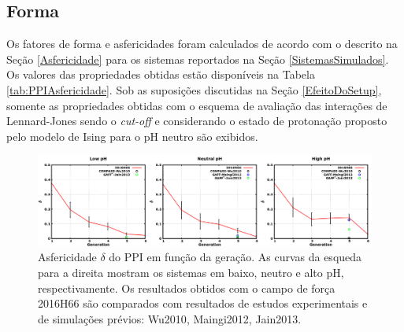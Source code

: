 \subsection{Forma}\label{PPIForma}

Os fatores de forma e asfericidades foram calculados de acordo com o descrito na Seção \ref{Asfericidade} para os sistemas reportados na Seção \ref{SistemasSimulados}.
Os valores das propriedades obtidas estão disponíveis na Tabela \ref{tab:PPIAsfericidade}.
Sob as suposições discutidas na Seção \ref{EfeitoDoSetup}, somente as propriedades obtidas com o esquema de avaliação das interações de Lennard-Jones sendo o \textit{cut-off} e considerando o estado de protonação proposto pelo modelo de Ising\cite{VanDuijvenbode1998, Koper1997} para o pH neutro são exibidos.

\begin{figure}[ht!]
\centering
\includegraphics[width=\textwidth]{images/PPIAsphericity.png}
\caption{Asfericidade $\delta$ do PPI em função da geração. As curvas da esqueda para a direita mostram os sistemas em baixo, neutro e alto pH, respectivamente.
Os resultados obtidos com o campo de força 2016H66\cite{Horta2016} são comparados com resultados de estudos experimentais e de simulações prévios:
Wu2010\cite{Wu2010}, %
Maingi2012\cite{Maingi2012}, %
Jain2013\cite{Jain2013}.} %
\label{fig:PPIAsphericity}
\end{figure}

